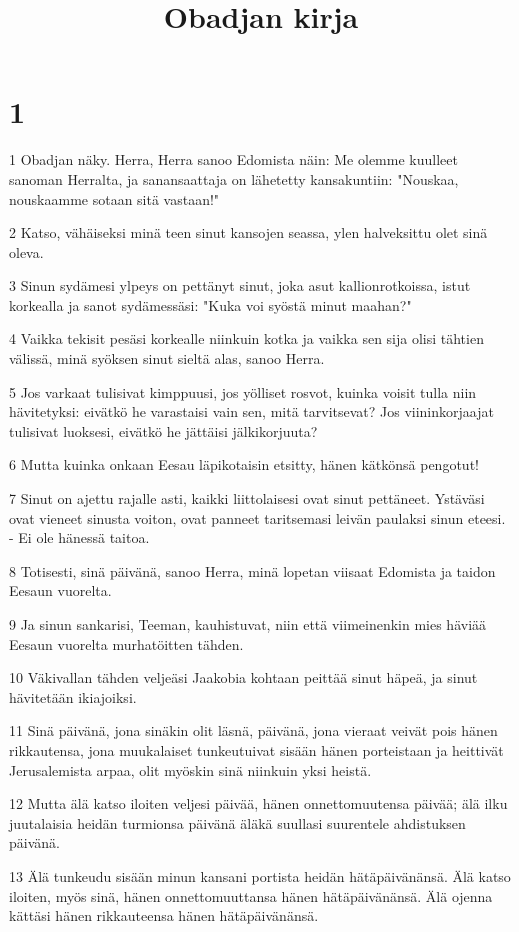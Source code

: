 

\title{Obadjan kirja}


\chapter{1}

\par 1 Obadjan näky. Herra, Herra sanoo Edomista näin: Me olemme kuulleet sanoman Herralta, ja sanansaattaja on lähetetty kansakuntiin: "Nouskaa, nouskaamme sotaan sitä vastaan!"
\par 2 Katso, vähäiseksi minä teen sinut kansojen seassa, ylen halveksittu olet sinä oleva.
\par 3 Sinun sydämesi ylpeys on pettänyt sinut, joka asut kallionrotkoissa, istut korkealla ja sanot sydämessäsi: "Kuka voi syöstä minut maahan?"
\par 4 Vaikka tekisit pesäsi korkealle niinkuin kotka ja vaikka sen sija olisi tähtien välissä, minä syöksen sinut sieltä alas, sanoo Herra.
\par 5 Jos varkaat tulisivat kimppuusi, jos yölliset rosvot, kuinka voisit tulla niin hävitetyksi: eivätkö he varastaisi vain sen, mitä tarvitsevat? Jos viininkorjaajat tulisivat luoksesi, eivätkö he jättäisi jälkikorjuuta?
\par 6 Mutta kuinka onkaan Eesau läpikotaisin etsitty, hänen kätkönsä pengotut!
\par 7 Sinut on ajettu rajalle asti, kaikki liittolaisesi ovat sinut pettäneet. Ystäväsi ovat vieneet sinusta voiton, ovat panneet taritsemasi leivän paulaksi sinun eteesi. - Ei ole hänessä taitoa.
\par 8 Totisesti, sinä päivänä, sanoo Herra, minä lopetan viisaat Edomista ja taidon Eesaun vuorelta.
\par 9 Ja sinun sankarisi, Teeman, kauhistuvat, niin että viimeinenkin mies häviää Eesaun vuorelta murhatöitten tähden.
\par 10 Väkivallan tähden veljeäsi Jaakobia kohtaan peittää sinut häpeä, ja sinut hävitetään ikiajoiksi.
\par 11 Sinä päivänä, jona sinäkin olit läsnä, päivänä, jona vieraat veivät pois hänen rikkautensa, jona muukalaiset tunkeutuivat sisään hänen porteistaan ja heittivät Jerusalemista arpaa, olit myöskin sinä niinkuin yksi heistä.
\par 12 Mutta älä katso iloiten veljesi päivää, hänen onnettomuutensa päivää; älä ilku juutalaisia heidän turmionsa päivänä äläkä suullasi suurentele ahdistuksen päivänä.
\par 13 Älä tunkeudu sisään minun kansani portista heidän hätäpäivänänsä. Älä katso iloiten, myös sinä, hänen onnettomuuttansa hänen hätäpäivänänsä. Älä ojenna kättäsi hänen rikkauteensa hänen hätäpäivänänsä.
